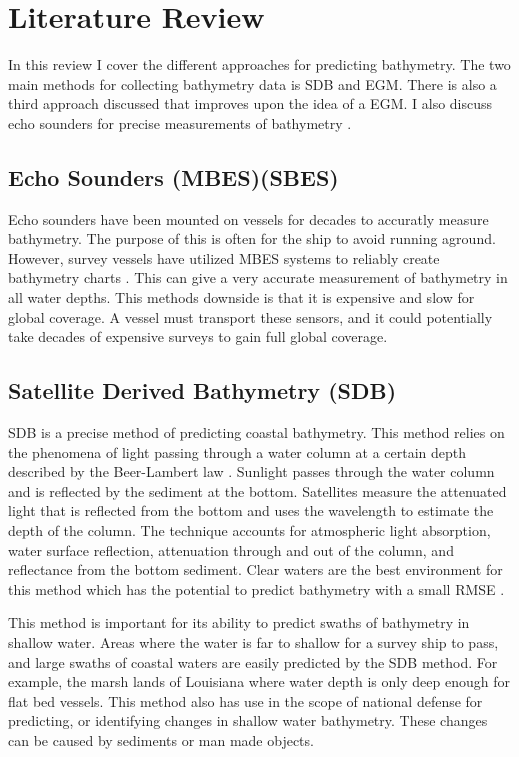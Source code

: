 \section{Literature Review}
\setlength{\parindent}{10ex}
In this review I cover the different approaches for predicting bathymetry.
The two main methods for collecting bathymetry data is \ac{SDB} and \ac{EGM}.
There is also a third approach discussed that improves upon the idea of a \ac{EGM}.
I also discuss echo sounders for precise measurements of bathymetry \cite{farr1980multibeam}.

\subsection{Echo Sounders (\ac{MBES})(\ac{SBES}) }
Echo sounders have been mounted on vessels for decades to accuratly measure bathymetry.
The purpose of this is often for the ship to avoid running aground.
However, survey vessels have utilized \ac{MBES} systems to reliably create bathymetry charts \cite{farr1980multibeam}.
This can give a very accurate measurement of bathymetry in all water depths.
This methods downside is that it is expensive and slow for global coverage.
A vessel must transport these sensors, and it could potentially take decades of expensive surveys to gain full global coverage.

\subsection{Satellite Derived Bathymetry (SDB)}
\ac{SDB} is a precise method of predicting coastal bathymetry. 
This method relies on the phenomena of light passing through a water column at a certain depth described by the Beer-Lambert law \cite{chybicki2018three}\cite{vinayaraj2016satellite}.
Sunlight passes through the water column and is reflected by the sediment at the bottom.
Satellites measure the attenuated light that is reflected from the bottom and uses the wavelength to estimate the depth of the column.
The technique accounts for atmospheric light absorption, water surface reflection, attenuation through and out of the column, and reflectance from the bottom sediment.
Clear waters are the best environment for this method which has the potential to predict bathymetry with a small RMSE \cite{chybicki2018three}.

\par
This method is important for its ability to predict swaths of bathymetry in shallow water.
Areas where the water is far to shallow for a survey ship to pass, and large swaths of coastal waters are easily predicted by the \ac{SDB} method.
For example, the marsh lands of Louisiana where water depth is only deep enough for flat bed vessels.
This method also has use in the scope of national defense for predicting, or identifying changes in shallow water bathymetry.
These changes can be caused by sediments or man made objects. 

